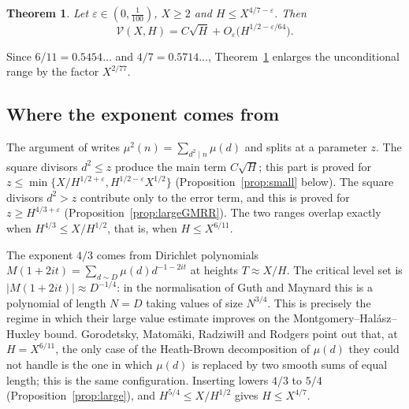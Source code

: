 \documentclass[11pt]{amsart}
\newtheorem{theorem}{Theorem}
\theoremstyle{remark}
\newcommand{\eps}{\varepsilon}
\begin{document}
\begin{theorem}\label{thm:main}
Let $\eps\in(0,\frac1{100})$, $X\ge 2$ and $H\le X^{4/7-\eps}$.  Then
\[
  \mathcal V(X,H)=C\sqrt H+O_\eps\bigl(H^{1/2-\eps/64}\bigr).
\]
\end{theorem}

Since $6/11=0.5454\ldots$ and $4/7=0.5714\ldots$, Theorem~\ref{thm:main}
enlarges the unconditional range by the factor $X^{2/77}$.

\subsection*{Where the exponent comes from}
The argument of \cite{GMRR} writes $\mu^2(n)=\sum_{d^2\mid n}\mu(d)$ and splits
at a parameter $z$.  The square divisors $d^2\le z$ produce the main term
$C\sqrt H$; this part is proved for
$z\le\min\{X/H^{1/2+\eps},H^{1/2-\eps}X^{1/2}\}$ (Proposition~\ref{prop:small}
below).  The square divisors $d^2>z$ contribute only to the error term, and
this is proved for $z\ge H^{4/3+\eps}$ (Proposition~\ref{prop:largeGMRR}).  The
two ranges overlap exactly when $H^{4/3}\le X/H^{1/2}$, that is, when
$H\le X^{6/11}$.

The exponent $4/3$ comes from Dirichlet polynomials
$M(1+2it)=\sum_{d\sim D}\mu(d)d^{-1-2it}$ at heights $T\approx X/H$.  The
critical level set is $|M(1+2it)|\approx D^{-1/4}$: in the normalisation of
Guth and Maynard this is a polynomial of length $N=D$ taking values of size
$N^{3/4}$.  This is precisely the regime in which their large value estimate
\cite[Theorem~1.1]{GM} improves on the Montgomery--Hal\'asz--Huxley bound.
Gorodetsky, Matom\"aki, Radziwi\l{}\l{} and Rodgers point out
\cite[end of Section~2]{GMRR} that, at $H=X^{6/11}$, the only case of the
Heath-Brown decomposition of $\mu(d)$ they could not handle is the one in which
$\mu(d)$ is replaced by two smooth sums of equal length; this is the same
configuration.  Inserting \cite[Theorem~1.1]{GM} lowers $4/3$ to $5/4$
(Proposition~\ref{prop:large}), and $H^{5/4}\le X/H^{1/2}$ gives $H\le X^{4/7}$.
\end{document}
